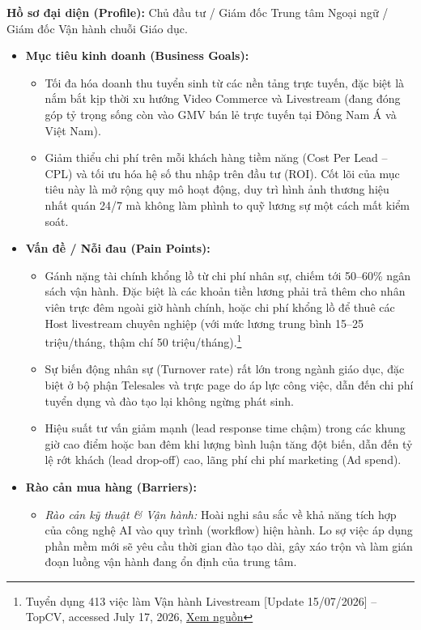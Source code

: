 \textbf{Hồ sơ đại diện (Profile):} Chủ đầu tư / Giám đốc Trung tâm Ngoại ngữ / Giám đốc Vận hành chuỗi Giáo dục.

\begin{itemize}
    \item \textbf{Mục tiêu kinh doanh (Business Goals):}
    \begin{itemize}
        \item Tối đa hóa doanh thu tuyển sinh từ các nền tảng trực tuyến, đặc biệt là nắm bắt kịp thời xu hướng Video Commerce và Livestream (đang đóng góp tỷ trọng sống còn vào GMV bán lẻ trực tuyến tại Đông Nam Á và Việt Nam).

        \item Giảm thiểu chi phí trên mỗi khách hàng tiềm năng (Cost Per Lead -- CPL) và tối ưu hóa hệ số thu nhập trên đầu tư (ROI). Cốt lõi của mục tiêu này là mở rộng quy mô hoạt động, duy trì hình ảnh thương hiệu nhất quán 24/7 mà không làm phình to quỹ lương sự một cách mất kiểm soát.
    \end{itemize}

    \item \textbf{Vấn đề / Nỗi đau (Pain Points):}
    \begin{itemize}
        \item Gánh nặng tài chính khổng lồ từ chi phí nhân sự, chiếm tới 50--60\% ngân sách vận hành. Đặc biệt là các khoản tiền lương phải trả thêm cho nhân viên trực đêm ngoài giờ hành chính, hoặc chi phí khổng lồ để thuê các Host livestream chuyên nghiệp (với mức lương trung bình 15--25 triệu/tháng, thậm chí 50 triệu/tháng).\footnote{Tuyển dụng 413 việc làm Vận hành Livestream [Update 15/07/2026] -- TopCV, accessed July 17, 2026, \href{https://www.topcv.vn/tim-viec-lam-van-hanh-livestream-cr1cb8cl618}{Xem nguồn}}

        \item Sự biến động nhân sự (Turnover rate) rất lớn trong ngành giáo dục, đặc biệt ở bộ phận Telesales và trực page do áp lực công việc, dẫn đến chi phí tuyển dụng và đào tạo lại không ngừng phát sinh.

        \item Hiệu suất tư vấn giảm mạnh (lead response time chậm) trong các khung giờ cao điểm hoặc ban đêm khi lượng bình luận tăng đột biến, dẫn đến tỷ lệ rớt khách (lead drop-off) cao, lãng phí chi phí marketing (Ad spend).
    \end{itemize}

    \item \textbf{Rào cản mua hàng (Barriers):}
    \begin{itemize}
        \item \textit{Rào cản kỹ thuật \& Vận hành:} Hoài nghi sâu sắc về khả năng tích hợp của công nghệ AI vào quy trình (workflow) hiện hành. Lo sợ việc áp dụng phần mềm mới sẽ yêu cầu thời gian đào tạo dài, gây xáo trộn và làm gián đoạn luồng vận hành đang ổn định của trung tâm.


\end{itemize}
\end{itemize}

